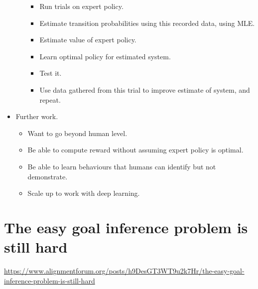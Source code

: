 \begin{itemize}
\begin{itemize}
\begin{itemize}
            \item Run trials on expert policy.
            \item Estimate transition probabilities using this recorded data, using MLE.
            \item Estimate value of expert policy.
            \item Learn optimal policy for estimated system.
            \item Test it.
            \item Use data gathered from this trial to improve estimate of system, and repeat.
        \end{itemize}
    \end{itemize}
    \item Further work.
    \begin{itemize}
        \item Want to go beyond human level.
        \item Be able to compute reward without assuming expert policy is optimal.
        \item Be able to learn behaviours that humans can identify but not demonstrate.
        \item Scale up to work with deep learning.
    \end{itemize}
\end{itemize}


\section{The easy goal inference problem is still hard}

\url{https://www.alignmentforum.org/posts/h9DesGT3WT9u2k7Hr/the-easy-goal-inference-problem-is-still-hard}

